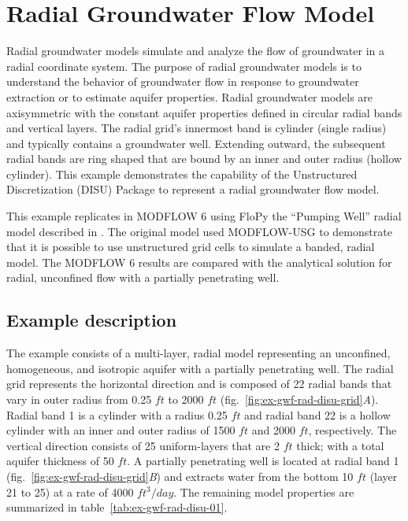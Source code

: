 \section{Radial Groundwater Flow Model}
Radial groundwater models simulate and analyze the flow of groundwater in a radial coordinate system. The purpose of radial groundwater models is to understand the behavior of groundwater flow in response to groundwater extraction or to estimate aquifer properties. Radial groundwater models are axisymmetric with the constant aquifer properties defined in circular radial bands and vertical layers. The radial grid’s innermost band is cylinder (single radius) and typically contains a groundwater well. Extending outward, the subsequent radial bands are ring shaped that are bound by an inner and outer radius (hollow cylinder). This example demonstrates the capability of the Unstructured Discretization (DISU) Package to represent a radial groundwater flow model.

This example replicates in MODFLOW 6 using FloPy the ``Pumping Well'' radial model described in \cite{bedekar2019axisym}. The original model used MODFLOW-USG to demonstrate that it is possible to use unstructured grid cells to simulate a banded, radial model. The MODFLOW 6 results are compared with the \cite{neuman1974effect} analytical solution for radial, unconfined flow with a partially penetrating well.


\subsection{Example description}

The example consists of a multi-layer, radial model representing an unconfined, homogeneous, and isotropic aquifer with a partially penetrating well. The radial grid represents the horizontal direction and is composed of 22 radial bands that vary in outer radius from 0.25 $ft$ to 2000 $ft$ 
(fig.~\ref{fig:ex-gwf-rad-disu-grid}\textit{A}). Radial band 1 is a cylinder with a radius 0.25 $ft$ and radial band 22 is a hollow cylinder with an inner and outer radius of 1500 $ft$ and 2000 $ft$, respectively. The vertical direction consists of 25 uniform-layers that are 2 $ft$ thick; with a total aquifer thickness of 50 $ft$. A partially penetrating well is located at radial band 1 
(fig.~\ref{fig:ex-gwf-rad-disu-grid}\textit{B}) and extracts water from the bottom 10 $ft$ (layer 21 to 25) at a rate of 4000 $ft^3/day$. The remaining model properties are summarized in table~\ref{tab:ex-gwf-rad-disu-01}.

